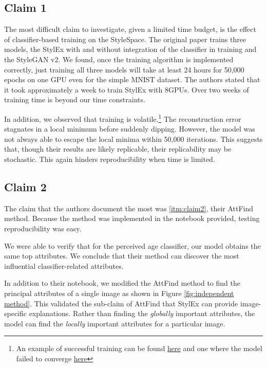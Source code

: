 \subsection{Claim 1}

The most difficult claim to investigate, given a limited time budget, is the effect of classifier-based training on the StyleSpace. The original paper trains three models, the StylEx with and without integration of the classifier in training and the StyleGAN v2. We found, once the training algorithm is implemented correctly, just training all three models will take at least 24 hours for 50,000 epochs on one GPU even for the simple MNIST dataset. The authors stated that it took approximately a week to train StylEx with 8GPUs. Over two weeks of training time is beyond our time constraints.

In addition, we observed that training is volatile.\footnote{An example of successful training can be found \href{https://app.labml.ai/run/841a8fde81b511eca9da0242ac1c0002}{here} and one where the model failed to converge {\href{https://app.labml.ai/run/0a2a0af682cd11ec8a010242ac1c0002}{here}}} The reconstruction error stagnates in a local minimum before suddenly dipping. However, the model was not always able to escape the local minima within 50,000 iterations. This suggests that, though their results are likely replicable, their replicability may be stochastic. This again hinders reproducibility when time is limited.

\subsection{Claim 2}

The claim that the authors document the most was \ref{itm:claim2}, their AttFind method. Because the method was implemented in the notebook provided, testing reproducibility was easy. 

We were able to verify that for the perceived age classifier, our model obtains the same top attributes. We conclude that their method can discover the most influential classifier-related attributes.

In addition to their notebook, we modified the AttFind method to find the principal attributes of a single image as shown in Figure \ref{fig:independent method}. This validated the sub-claim of AttFind that StylEx can provide image-specific explanations. Rather than finding the \textit{globally} important attributes, the model can find the \textit{locally} important attributes for a particular image.

